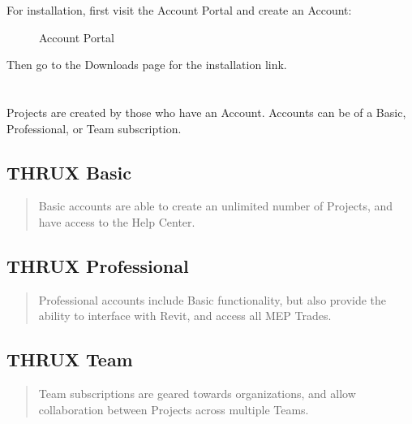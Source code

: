 \documentclass[letterpaper,10pt,english]{sphinxmanual}
\begin{document}
For installation, first visit the Account Portal and create an Account:


\begin{figure}[H]
\centering
\capstart

\noindent{}
\caption{Account Portal}\label{\detokenize{docs/introduction/index-thrux:id2}}\end{figure}

Then go to the Downloads page for the installation link.


\section{}
\label{\detokenize{docs/introduction/index-thrux:accounts-projects-branches-and-subcriptions}}
Projects are created by those who have an Account.  Accounts can be of a Basic, Professional, or Team subscription.


\subsection{THRUX Basic}
\label{\detokenize{docs/introduction/index-thrux:thrux-basic}}\begin{quote}

Basic accounts are able to create an unlimited number of Projects, and have access to the Help Center.
\end{quote}


\subsection{THRUX Professional}
\label{\detokenize{docs/introduction/index-thrux:thrux-professional}}\begin{quote}

Professional accounts include Basic functionality, but also provide the ability to interface with Revit, and access all MEP Trades.
\end{quote}


\subsection{THRUX Team}
\label{\detokenize{docs/introduction/index-thrux:thrux-team}}\begin{quote}

Team subscriptions are geared towards organizations, and allow collaboration between Projects across multiple Teams.
\end{quote}
\end{document}
